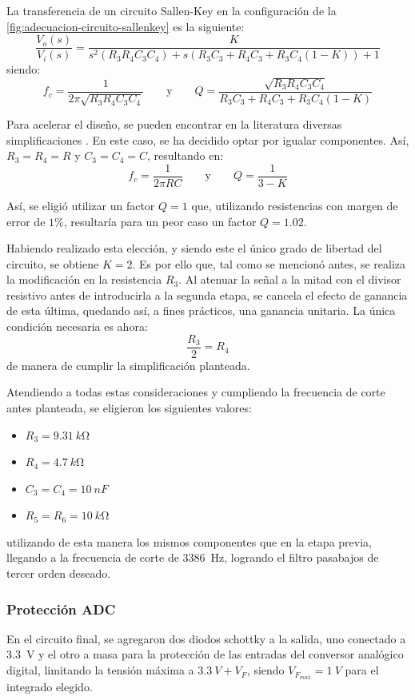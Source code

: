 \documentclass[../et.tex]{subfiles}
\begin{document}
  La transferencia de un circuito Sallen-Key en la configuración de la \autoref{fig:adecuacion-circuito-sallenkey} es la siguiente:
  \[
    \frac{V_o(s)}{V_i(s)} = \frac{K}{s^2(R_3R_4C_3C_4) + s(R_3C_3+R_4C_3+R_3C_4(1-K)) + 1}
  \]
  siendo:
  \[
    f_c = \frac{1}{2\pi \sqrt{R_3R_4C_3C_4}} \qquad \text{y} \qquad Q = \frac{\sqrt{R_3R_4C_3C_4}}{R_3C_3+R_4C_3+R_3C_4(1-K)}
  \]

  Para acelerar el diseño, se pueden encontrar en la literatura diversas simplificaciones \cite{ti:sloa024b}. En este caso, se ha decidido optar por igualar componentes. Así, $R_3 = R_4 = R$ y $C_3 = C_4 = C$, resultando en:
  \[
    f_c = \frac{1}{2\pi RC} \qquad \text{y} \qquad Q = \frac{1}{3 - K}
  \]

  Así, se eligió utilizar un factor $Q=1$ que, utilizando resistencias con margen de error de $1 \%$, resultaría para un peor caso un factor $Q=1.02$.

  Habiendo realizado esta elección, y siendo este el único grado de libertad del circuito, se obtiene $K=2$. Es por ello que, tal como se mencionó antes, se realiza la modificación en la resistencia $R_3$. Al atenuar la señal a la mitad con el divisor resistivo antes de introducirla a la segunda etapa, se cancela el efecto de ganancia de esta última, quedando así, a fines prácticos, una ganancia unitaria. La única condición necesaria es ahora:
  \[
      \frac{R_3}{2} = R_4
  \]
  de manera de cumplir la simplificación planteada.

  Atendiendo a todas estas consideraciones y cumpliendo la frecuencia de corte antes planteada, se eligieron los siguientes valores:
  \begin{itemize}
      \item $R_3 = \SI{9.31}{k\ohm}$
      \item $R_4 = \SI{4.7}{k\ohm}$
      \item $C_3 = C_4 = \SI{10}{nF}$
      \item $R_5 = R_6 = \SI{10}{k\ohm}$
  \end{itemize}
  utilizando de esta manera los mismos componentes que en la etapa previa, llegando a la frecuencia de corte de \SI{3386}{Hz}, logrando el filtro pasabajos de tercer orden deseado.

  \subsubsection{Protección ADC}
  En el circuito final, se agregaron dos diodos schottky a la salida, uno conectado a \SI{3.3}{V} y el otro a masa para la protección de las entradas del conversor analógico digital, limitando la tensión máxima a $\SI{3.3}{V} + V_F$, siendo $V_{F_{max}} = \SI{1}{V}$ para el integrado elegido.
\end{document}
